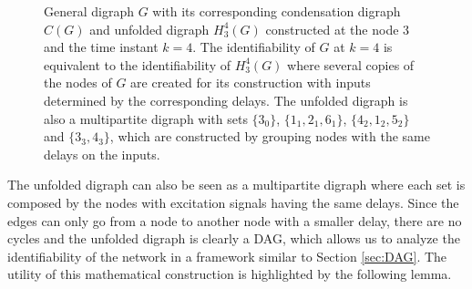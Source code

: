 \documentclass[letterpaper,10pt,journal]{IEEEtran}
\begin{document}
\begin{figure}
    \caption{General digraph $G$ with its corresponding condensation digraph $C(G)$ and unfolded digraph $H_3^4(G)$ constructed at the node 3 and the time instant $k=4$. The identifiability of $G$ at $k=4$ is equivalent to the identifiability of $H_3^4(G)$ where several copies of the nodes of $G$ are created for its construction with inputs determined by the corresponding delays.
    The unfolded digraph is also a multipartite digraph with sets $\{ 3_0\}$, $\{ 1_1,2_1,6_1\}$, $\{ 4_2,1_2,5_2\}$ and $\{ 3_3,4_3\}$, 
    which are constructed by grouping nodes with the same delays on the inputs. 
    }
    \label{fig:general_digraph}
\end{figure}




The unfolded digraph can also be seen as a multipartite digraph where each set is composed by the nodes with excitation signals having the same delays. Since the edges can only go from a node to another node with a smaller delay, there are no cycles and the unfolded digraph is clearly a DAG, which allows us to analyze the identifiability of the network in a framework similar to Section \ref{sec:DAG}. The utility of this mathematical construction is highlighted by the following lemma.
\end{document}
